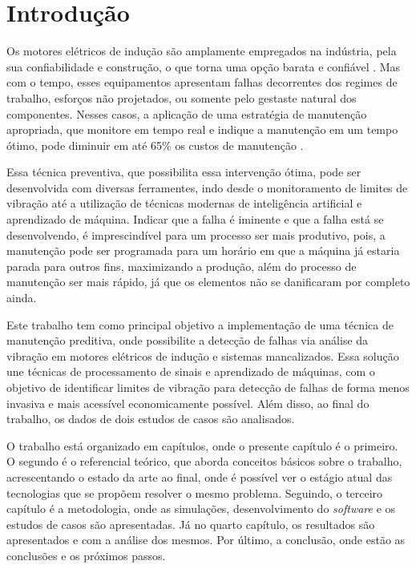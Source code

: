 
\chapter[Introdução]{Introdução}

Os motores elétricos de indução são amplamente empregados na indústria, pela sua confiabilidade e construção, o que torna uma opção 
barata e confiável \cite{Umans2003}. Mas com o tempo, esses equipamentos apresentam falhas decorrentes dos regimes de trabalho, esforços não 
projetados, ou somente pelo gestaste natural dos componentes. Nesses casos, a aplicação de uma estratégia de manutenção apropriada, que
monitore em tempo real e indique a manutenção em um tempo ótimo, pode diminuir em até 65\% os custos de manutenção \cite{Wu2013}. 

Essa técnica preventiva, que possibilita essa intervenção ótima, pode ser desenvolvida com diversas ferramentes, indo desde o monitoramento
de limites de vibração até a utilização de técnicas modernas de inteligência artificial e aprendizado de máquina. Indicar que a falha é
iminente e que a falha está se desenvolvendo, é imprescindível para um processo ser mais produtivo, pois, a manutenção pode ser programada
para um horário em que a máquina já estaria parada para outros fins, maximizando a produção, além do processo de manutenção ser mais rápido, 
já que os elementos não se danificaram por completo ainda.

Este trabalho tem como principal objetivo a implementação de uma técnica de manutenção preditiva, onde possibilite a detecção
de falhas via análise da vibração em motores elétricos de indução e sistemas mancalizados. Essa solução une técnicas de processamento de 
sinais e aprendizado de máquinas, com o objetivo de identificar limites de vibração para detecção de falhas de forma menos invasiva e mais 
acessível economicamente possível. Além disso, ao final do trabalho, os dados de dois estudos de casos são analisados.

O trabalho está organizado em capítulos, onde o presente capítulo é o primeiro. O segundo é o referencial teórico, que aborda conceitos
básicos sobre o trabalho, acrescentando o estado da arte ao final, onde é possível ver o estágio atual das tecnologias que se propõem 
resolver o mesmo problema. Seguindo, o terceiro capítulo é a metodologia, onde as simulações, desenvolvimento do \textit{software} e os estudos de
casos são apresentadas. Já no quarto capítulo, os resultados são apresentados e com a análise dos mesmos. Por último, a 
conclusão, onde estão as conclusões e os próximos passos.





